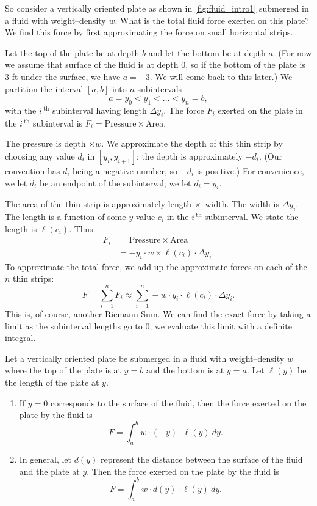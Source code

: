 So consider a vertically oriented plate as shown in \autoref{fig:fluid_intro1} submerged in a fluid with weight--density $w$. What is the total fluid force exerted on this plate? We find this force by first approximating the force on small horizontal strips.

Let the top of the plate be at depth $b$ and let the bottom be at depth $a$. (For now we assume that surface of the fluid is at depth 0, so if the bottom of the plate is 3 ft under the surface, we have $a=-3$. We will come back to this later.) We partition the interval $[a,b]$ into $n$ subintervals 
\[a=y_0<y_1<\dotso<y_n=b,\]
with the $i\,^\text{th}$ subinterval having length $\Delta y_i$. The force $F_i$ exerted on the plate in the $i\,^\text{th}$ subinterval is $F_i = \text{Pressure}\times \text{Area}.$

The pressure is depth $\times w$. We approximate the depth of this thin strip by choosing any value $d_i$ in $[y_i,y_{i+1}]$; the depth is approximately $-d_i$. (Our convention has $d_i$ being a negative number, so $-d_i$ is positive.) For convenience, we let $d_i$ be an endpoint of the subinterval; we let $d_i = y_i$. 

The area of the thin strip is approximately length $\times$\ width. The width is $\Delta y_i$. The length is a function of some $y$-value $c_i$ in the $i\,^\text{th}$ subinterval. We state the length is $\ell(c_i)$. Thus 
\begin{align*}
	F_i	&= \text{Pressure} \times \text{Area} \\
		&=	-y_i\cdot w \times \ell(c_i)\cdot\Delta y_i.
\end{align*}
To approximate the total force, we add up the approximate forces on each of the $n$ thin strips:
\[
F = \sum_{i=1}^n F_i \approx \sum_{i=1}^n -w\cdot y_i\cdot\ell(c_i)\cdot\Delta y_i.
\]
This is, of course, another Riemann Sum. We can find the exact force by taking a limit as the subinterval lengths go to 0; we evaluate this limit with a definite integral.

{Let a vertically oriented plate be submerged in a fluid with weight--density $w$ where the top of the plate is at $y=b$ and the bottom is at $y=a$. Let $\ell(y)$ be the length of the plate at $y$.
\begin{enumerate}
	\item	If $y=0$ corresponds to the surface of the fluid, then the force exerted on the plate by the fluid is
	\[F=\int_a^b w\cdot(-y)\cdot\ell(y)\ dy.\]
	\item	In general, let $d(y)$ represent the distance between the surface of the fluid and the plate at $y$. Then the force exerted on the plate by the fluid is 
	\[F=\int_a^b w\cdot d(y)\cdot\ell(y)\ dy.\]
\end{enumerate}}

